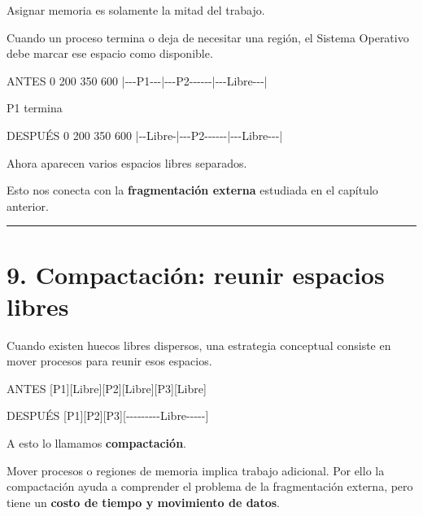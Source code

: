 \documentclass[
  spanish,
  letterpaper,
]{scrbook}
\newenvironment{Shaded}{\begin{snugshade}}{\end{snugshade}}
\newcommand{\NormalTok}[1]{\textcolor[rgb]{0.00,0.23,0.31}{#1}}
\begin{document}
Asignar memoria es solamente la mitad del trabajo.

Cuando un proceso termina o deja de necesitar una región, el Sistema
Operativo debe marcar ese espacio como disponible.

\begin{Shaded}
\begin{Highlighting}[]
\NormalTok{ANTES}
\NormalTok{0        200        350        600}
\NormalTok{|{-}{-}{-}P1{-}{-}{-}|{-}{-}{-}P2{-}{-}{-}{-}{-}{-}|{-}{-}{-}Libre{-}{-}{-}|}

\NormalTok{P1 termina}

\NormalTok{DESPUÉS}
\NormalTok{0        200        350        600}
\NormalTok{|{-}{-}Libre{-}|{-}{-}{-}P2{-}{-}{-}{-}{-}{-}|{-}{-}{-}Libre{-}{-}{-}|}
\end{Highlighting}
\end{Shaded}

Ahora aparecen varios espacios libres separados.

Esto nos conecta con la \textbf{fragmentación externa} estudiada en el
capítulo anterior.

\begin{center}\rule{0.5\linewidth}{0.5pt}\end{center}


\chapter{9. Compactación: reunir espacios
libres}\label{compactaciuxf3n-reunir-espacios-libres}

Cuando existen huecos libres dispersos, una estrategia conceptual
consiste en mover procesos para reunir esos espacios.

\begin{Shaded}
\begin{Highlighting}[]
\NormalTok{ANTES}
\NormalTok{[P1][Libre][P2][Libre][P3][Libre]}

\NormalTok{DESPUÉS}
\NormalTok{[P1][P2][P3][{-}{-}{-}{-}{-}{-}{-}{-}{-}Libre{-}{-}{-}{-}{-}]}
\end{Highlighting}
\end{Shaded}

A esto lo llamamos \textbf{compactación}.

\begin{tcolorbox}[enhanced jigsaw, arc=.35mm, bottomrule=.15mm, bottomtitle=1mm, breakable, colback=white, colbacktitle=quarto-callout-warning-color!10!white, colframe=quarto-callout-warning-color-frame, coltitle=black, left=2mm, leftrule=.75mm, opacityback=0, opacitybacktitle=0.6, rightrule=.15mm, title=\textcolor{quarto-callout-warning-color}{\faExclamationTriangle}\hspace{0.5em}{La compactación no es gratuita}, titlerule=0mm, toprule=.15mm, toptitle=1mm]

Mover procesos o regiones de memoria implica trabajo adicional. Por ello
la compactación ayuda a comprender el problema de la fragmentación
externa, pero tiene un \textbf{costo de tiempo y movimiento de datos}.

\end{tcolorbox}
\end{document}
